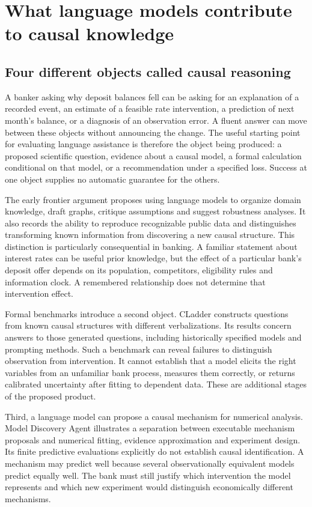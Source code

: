 \chapter{What language models contribute to causal knowledge}
\label{la:frontier}

\section{Four different objects called causal reasoning}

A banker asking why deposit balances fell can be asking for an explanation of
a recorded event, an estimate of a feasible rate intervention, a prediction of
next month's balance, or a diagnosis of an observation error. A fluent answer
can move between these objects without announcing the change. The useful
starting point for evaluating language assistance is therefore the object
being produced: a proposed scientific question, evidence about a causal model,
a formal calculation conditional on that model, or a recommendation under a
specified loss. Success at one object supplies no automatic guarantee for the
others.

The early frontier argument proposes using language models to organize domain
knowledge, draft graphs, critique assumptions and suggest robustness analyses.
It also records the ability to reproduce recognizable public data and
distinguishes transforming known information from discovering a new causal
structure.\cite{v12_la_2305_00050} This distinction is particularly consequential
in banking. A familiar statement about interest rates can be useful prior
knowledge, but the effect of a particular bank's deposit offer depends on its
population, competitors, eligibility rules and information clock. A remembered
relationship does not determine that intervention effect.

Formal benchmarks introduce a second object. CLadder constructs questions from
known causal structures with different verbalizations. Its results concern
answers to those generated questions, including historically specified models
and prompting methods.\cite{v12_la_2312_04350} Such a benchmark can reveal failures
to distinguish observation from intervention. It cannot establish that a model
elicits the right variables from an unfamiliar bank process, measures them
correctly, or returns calibrated uncertainty after fitting to dependent data.
These are additional stages of the proposed product.

Third, a language model can propose a causal mechanism for numerical analysis.
Model Discovery Agent illustrates a separation between executable mechanism
proposals and numerical fitting, evidence approximation and experiment design.
Its finite predictive evaluations explicitly do not establish causal
identification.\cite{v12_la_2608_09696} A mechanism may predict well because
several observationally equivalent models predict equally well. The bank must
still justify which intervention the model represents and which new experiment
would distinguish economically different mechanisms.

